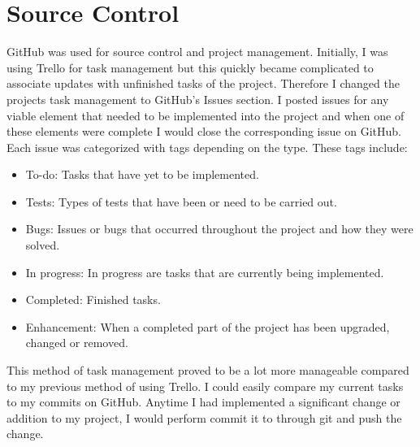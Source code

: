 \section{Source Control}
GitHub was used for source control and project management. Initially, I was using Trello for task management but this quickly became complicated to associate updates with unfinished tasks of the project. Therefore I changed the projects task management to GitHub’s Issues section. I posted issues for any viable element that needed to be implemented into the project and when one of these elements were complete I would close the corresponding issue on GitHub. Each issue was categorized with tags depending on the type. These tags include:
\begin{itemize}
	\item To-do: Tasks that have yet to be implemented.
	\item Tests: Types of tests that have been or need to be carried out.
	\item Bugs: Issues or bugs that occurred throughout the project and how they were solved.
	\item In progress: In progress are tasks that are currently being implemented.
	\item Completed: Finished tasks.
	\item Enhancement: When a completed part of the project has been upgraded, changed or removed.
\end{itemize}
This method of task management proved to be a lot more manageable compared to my previous method of using Trello. I could easily compare my current tasks to my commits on GitHub. Anytime I had implemented a significant change or addition to my project, I would perform commit it to through git and push the change.

